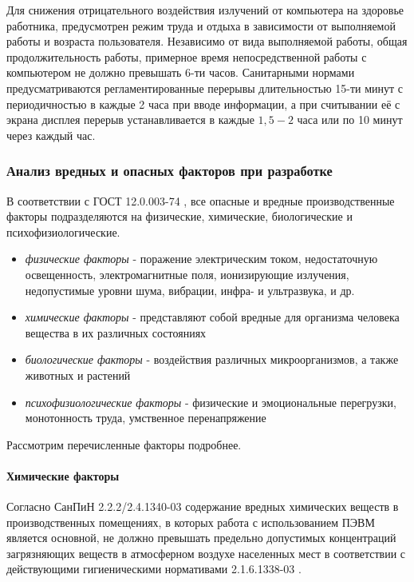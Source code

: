 Для снижения отрицательного воздействия излучений от компьютера
на здоровье работника, предусмотрен режим труда и отдыха в зависимости от выполняемой
работы и возраста пользователя. Независимо от вида выполняемой работы, общая
продолжительность работы, примерное время непосредственной работы с компьютером
не должно превышать 6-ти часов. Санитарными нормами предусматриваются регламентированные
перерывы длительностью 15-ти минут с периодичностью в каждые 2 часа при вводе
информации, а при считывании её с экрана дисплея перерыв устанавливается в
каждые $1,5 - 2$ часа или по 10 минут через каждый час.

\newpage
\subsubsection{Анализ вредных и опасных факторов при разработке}

В соответствии с ГОСТ 12.0.003-74 \cite{ecology_gost_003_74}, все опасные и
вредные производственные факторы подразделяются на физические, химические,
биологические и психофизиологические.

\begin{itemize}
    \item \textit{физические факторы} - поражение электрическим током, недостаточную
        освещенность, электромагнитные поля, ионизирующие излучения, недопустимые
        уровни шума, вибрации, инфра- и ультразвука, и др.
    \item \textit{химические факторы} - представляют собой вредные для организма
        человека вещества в их различных состояниях
    \item \textit{биологические факторы} - воздействия различных микроорганизмов,
        а также животных и растений
    \item \textit{психофизиологические факторы} - физические и эмоциональные
        перегрузки, монотонность труда, умственное перенапряжение

\end{itemize}

Рассмотрим перечисленные факторы подробнее.

\paragraph{Химические факторы}

Согласно СанПиН 2.2.2/2.4.1340-03 \cite{ecology_sanpin_1340_03} содержание вредных
химических веществ в
производственных помещениях, в которых работа с использованием ПЭВМ является
основной, не должно превышать предельно допустимых концентраций загрязняющих
веществ в атмосферном воздухе населенных мест в соответствии с действующими
гигиеническими нормативами 2.1.6.1338-03 \cite{ecology_hygiene_norm_1338_03}.

